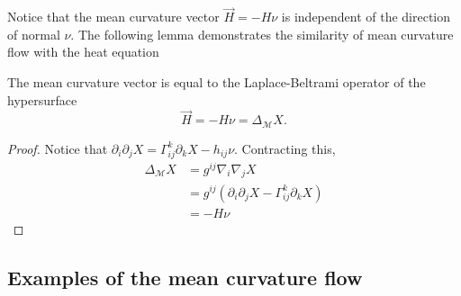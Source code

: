 Notice that the mean curvature vector $ \vec{H} = -H \nu  $ is independent of the direction of normal $ \nu $. %
The following lemma demonstrates the similarity of mean curvature flow with the heat equation 

\begin{lemma}
    The mean curvature vector is equal to the Laplace-Beltrami operator of the hypersurface  
    \[ \vec{H} = -H \nu = \Delta_{\mathcal{M}}X . \]
\end{lemma}
\begin{proof}
    Notice that $ \partial_{i}\partial_{j}X = \Gamma_{ij}^{k}\partial_{k}X - h_{ij}\nu $. Contracting this, 
    \begin{align*}
        \Delta_{\mathcal{M}}X & = g^{ij}\nabla_{i}\nabla_{j}X \\
        & = g^{ij}(\partial_{i}\partial_{j}X - \Gamma_{ij}^{k}\partial_{k}X) \\
        & = - H \nu
    \end{align*}
    
\end{proof}

\subsection{Examples of the mean curvature flow}

